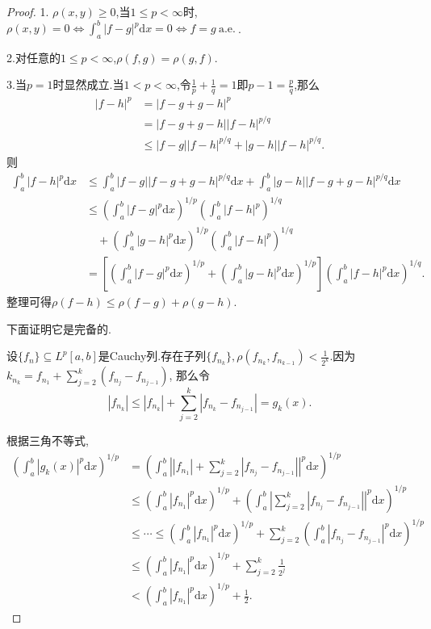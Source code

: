 \documentclass[a4paper,oneside,12pt]{ctexart}
\theoremstyle{plain}
\theoremstyle{nonumberplain}
\theoremstyle{nonumberplain}
\newtheorem{proof}{证明.}
\newcommand{\dif}{\mathrm{d}}
\newcommand{\abs}[1]{\left\vert#1\right\vert}
\renewcommand{\ae}{\ \mathrm{a.e.}\ }
\begin{document}
\begin{proof}
    1. $\rho(x,y)\geqslant 0$,当$1\leqslant p<\infty$时,$\rho(x,y)=0\Leftrightarrow \int_a^b\abs{f-g}^p\dif x=0\Leftrightarrow f=g\ae$.

    2.对任意的$1\leqslant p< \infty$,$\rho(f,g)=\rho(g,f)$.

    3.当$p=1$时显然成立.当$1<p<\infty$,令$\frac{1}{p}+\frac{1}{q}=1$即$p-1=\frac{p}{q}$,那么 
    \begin{align*}
        \abs{f-h}^p&=\abs{f-g+g-h}^p\\
        &=\abs{f-g+g-h}\abs{f-h}^{p/q}\\
        &\leqslant \abs{f-g}\abs{f-h}^{p/q}+\abs{g-h}\abs{f-h}^{p/q}.
    \end{align*}
    则 
    \begin{align*}
        \int_a^b\abs{f-h}^p\dif x&\leqslant \int_a^b\abs{f-g}\abs{f-g+g-h}^{p/q}\dif x+\int_a^b\abs{g-h}\abs{f-g+g-h}^{p/q}\dif x\\
        &\leqslant \left(\int_a^b\abs{f-g}^p\dif x\right)^{1/p}\left(\int_a^b\abs{f-h}^p\right)^{1/q}\\
        &\quad +\left(\int_a^b\abs{g-h}^p\dif x\right)^{1/p}\left(\int_a^b\abs{f-h}^p\right)^{1/q}\\
        &=\left[\left(\int_a^b\abs{f-g}^p\dif x\right)^{1/p}+\left(\int_a^b\abs{g-h}^p\dif x\right)^{1/p}\right]\left(\int_a^b\abs{f-h}^p\dif x\right)^{1/q}.
    \end{align*}
    整理可得$\rho(f-h)\leqslant\rho(f-g)+\rho(g-h)$.

    下面证明它是完备的.

    设$\{f_n\}\subseteq L^p[a,b]$是Cauchy列.存在子列$\{f_{n_k}\},\rho(f_{n_k},f_{n_{k-1}})<\frac{1}{2^k}$.因为$k_{n_k}=f_{n_1}+\sum_{j=2}^k(f_{n_j}-f_{n_{j-1}})$,
    那么令
    \begin{equation*}
        \abs{f_{n_k}}\leqslant\abs{f_{n_k}}+\sum_{j=2}^k\abs{f_{n_k}-f_{n_{j-1}}}=g_k(x).
    \end{equation*}

    根据三角不等式,
    \begin{align*}
        \left(\int_a^b\abs{g_k(x)}^p\dif x\right)^{1/p}&=\left(\int_a^b\abs{\abs{f_{n_1}}+\sum_{j=2}^k\abs{f_{n_j}-f_{n_{j-1}}}}^p\dif x\right)^{1/p}\\
        &\leqslant \left(\int_a^b\abs{f_{n_1}}^p\dif x\right)^{1/p}+\left(\int_a^b\abs{\sum_{j=2}^k\abs{f_{n_j}-f_{n_{j-1}}}}^p\dif x\right)^{1/p}\\
        &\leqslant\cdots\leqslant \left(\int_a^b\abs{f_{n_1}}^p\dif x\right)^{1/p}+\sum_{j=2}^k\left(\int_a^b\abs{f_{n_j}-f_{n_{j-1}}}^p\dif x\right)^{1/p}\\
        &\leqslant \left(\int_a^b\abs{f_{n_1}}^p\dif x\right)^{1/p}+\sum_{j=2}^k\frac{1}{2^j}\\
        &<\left(\int_a^b\abs{f_{n_1}}^p\dif x\right)^{1/p}+\frac{1}{2}.
    \end{align*}


\end{proof}
\end{document}
